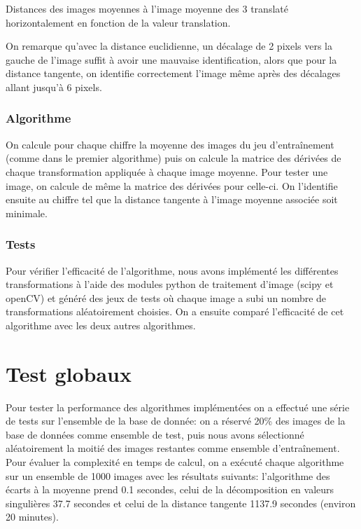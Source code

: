 \documentclass[a4paper,11pt,twoside]{report}
\begin{document}

Distances des images moyennes à l'image moyenne des 3 translaté horizontalement en fonction de la valeur translation.


On remarque qu'avec la distance euclidienne, un décalage de 2 pixels vers la gauche de l'image suffit à avoir une mauvaise identification, alors que pour la distance tangente, on identifie correctement l'image même après des décalages allant jusqu'à 6 pixels.


\subsection{Algorithme}
On calcule pour chaque chiffre la moyenne des images du jeu d'entraînement (comme dans le premier algorithme) puis on calcule la matrice des dérivées de chaque transformation appliquée à chaque image moyenne. Pour tester une image, on calcule de même la matrice des dérivées pour celle-ci. On l'identifie ensuite au chiffre tel que la distance tangente à l'image moyenne associée soit minimale.



\subsection{Tests}
Pour vérifier l'efficacité de l'algorithme, nous avons implémenté les différentes transformations à l'aide des modules python de traitement d'image (scipy et openCV) et généré des jeux de tests où chaque image a subi un nombre de transformations aléatoirement choisies. On a ensuite comparé l'efficacité de cet algorithme avec les deux autres algorithmes.


\chapter{Test globaux}

Pour tester la performance des algorithmes implémentées on a effectué une série de tests sur l'ensemble de la base de donnée: on a réservé 20\% des images de la base de données comme ensemble de test, puis nous avons sélectionné aléatoirement la moitié des images restantes comme ensemble d’entraînement.\\
Pour évaluer la complexité en temps de calcul, on a exécuté chaque algorithme sur un ensemble de 1000 images avec les résultats suivants: l'algorithme des écarts à la moyenne prend 0.1 secondes, celui de la décomposition en valeurs singulières 37.7 secondes et celui de la distance tangente 1137.9 secondes (environ 20 minutes).
\end{document}
